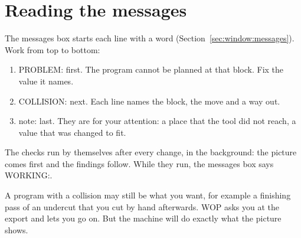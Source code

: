 \section{Reading the messages}\label{sec:checking:messages}
The messages box starts each line with a word (Section~\ref{sec:window:messages}). Work from top to bottom:
\begin{enumerate}
  \item \textsf{PROBLEM:} first. The program cannot be planned at that block. Fix the value it names.
  \item \textsf{COLLISION:} next. Each line names the block, the move and a way out.
  \item \textsf{note:} last. They are for your attention: a place that the tool did not reach, a value that was changed to fit.
\end{enumerate}
The checks run by themselves after every change, in the background: the picture comes first and the findings follow. While they run, the messages box says \textsf{WORKING:}.

\begin{tipbox}
A program with a collision may still be what you want, for example a finishing pass of an undercut that you cut by hand afterwards. WOP asks you at the export and lets you go on. But the machine will do exactly what the picture shows.
\end{tipbox}
